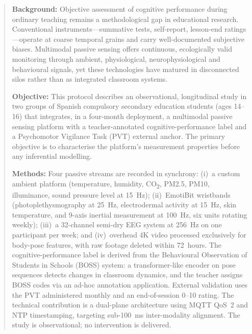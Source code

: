 
\begin{abstract}
\noindent \singlespacing

\noindent \textbf{Background:} Objective assessment of cognitive performance during ordinary teaching remains a methodological gap in educational research. Conventional instruments---summative tests, self-report, lesson-end ratings---operate at coarse temporal grains and carry well-documented subjective biases. Multimodal passive sensing offers continuous, ecologically valid monitoring through ambient, physiological, neurophysiological and behavioural signals, yet these technologies have matured in disconnected silos rather than as integrated classroom systems.

\noindent \textbf{Objective:} This protocol describes an observational, longitudinal study in two groups of Spanish compulsory secondary education students (ages 14--16) that integrates, in a four-month deployment, a multimodal passive sensing platform with a teacher-annotated cognitive-performance label and a Psychomotor Vigilance Task (PVT) external anchor. The primary objective is to characterise the platform's measurement properties before any inferential modelling.

\noindent \textbf{Methods:} Four passive streams are recorded in synchrony: (i)~a custom ambient platform (temperature, humidity, CO\textsubscript{2}, PM2.5, PM10, illuminance, sound pressure level at 15~Hz); (ii)~EmotiBit wristbands (photoplethysmography at 25~Hz, electrodermal activity at 15~Hz, skin temperature, and 9-axis inertial measurement at 100~Hz, six units rotating weekly); (iii)~a 32-channel semi-dry EEG system at 256~Hz on one participant per week; and (iv)~overhead 4K video processed exclusively for body-pose features, with raw footage deleted within 72~hours. The cognitive-performance label is derived from the Behavioural Observation of Students in Schools (BOSS) system: a transformer-like encoder on pose sequences detects changes in classroom dynamics, and the teacher assigns BOSS codes via an ad-hoc annotation application. External validation uses the PVT administered monthly and an end-of-session 0--10 rating. The technical contribution is a dual-plane architecture using MQTT QoS~2 and NTP timestamping, targeting sub-100~ms inter-modality alignment. The study is observational; no intervention is delivered.


\end{abstract}
